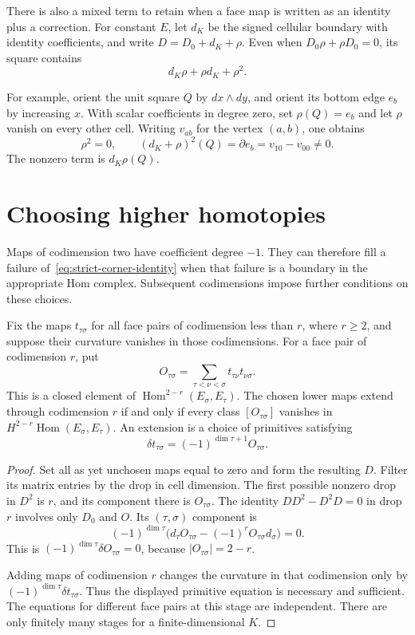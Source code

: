 There is also a mixed term to retain when a face map is written as
an identity plus a correction.
For constant $E$, let $d_K$ be the signed cellular boundary with identity
coefficients, and write $D=D_0+d_K+\rho$.
Even when $D_0\rho+\rho D_0=0$, its square contains
\[
 d_K\rho+\rho d_K+\rho^2.
\]

For example, orient the unit square $Q$ by $dx\wedge dy$,
and orient its bottom edge $e_b$ by increasing $x$.
With scalar coefficients in degree zero, set $\rho(Q)=e_b$
and let $\rho$ vanish on every other cell.
Writing $v_{ab}$ for the vertex $(a,b)$, one obtains
\[
 \rho^2=0,\qquad
 (d_K+\rho)^2(Q)=\partial e_b=v_{10}-v_{00}\ne0.
\]
The nonzero term is $d_K\rho(Q)$.

\section{Choosing higher homotopies}
Maps of codimension two have coefficient degree $-1$.
They can therefore fill a failure of~\eqref{eq:strict-corner-identity}
when that failure is a boundary in the appropriate Hom complex.
Subsequent codimensions impose further conditions on these choices.

\begin{proposition}\label{prop:cellular-obstruction}
Fix the maps $t_{\tau\sigma}$ for all face pairs of codimension less than
$r$, where $r\ge2$, and suppose their curvature vanishes in those
codimensions.
For a face pair of codimension $r$, put
\[
 O_{\tau\sigma}=
       \sum_{\tau<\nu<\sigma}t_{\tau\nu}t_{\nu\sigma}.
\]
This is a closed element of
$\operatorname{Hom}^{2-r}(E_\sigma,E_\tau)$.
The chosen lower maps extend through codimension $r$ if and only if
every class $[O_{\tau\sigma}]$ vanishes in
$H^{2-r}\operatorname{Hom}(E_\sigma,E_\tau)$.
An extension is a choice of primitives satisfying
\[
 \delta t_{\tau\sigma}
       =(-1)^{\dim\tau+1}O_{\tau\sigma}.
\]
\end{proposition}
\begin{proof}
Set all as yet unchosen maps equal to zero and form the resulting $D$.
Filter its matrix entries by the drop in cell dimension.
The first possible nonzero drop in $D^2$ is $r$, and its component there
is $O_{\tau\sigma}$.
The identity $DD^2-D^2D=0$ in drop $r$ involves only $D_0$ and $O$.
Its $(\tau,\sigma)$ component is
\[
 (-1)^{\dim\tau}
 \bigl(d_\tau O_{\tau\sigma}-(-1)^r
                     O_{\tau\sigma}d_\sigma\bigr)=0.
\]
This is $(-1)^{\dim\tau}\delta O_{\tau\sigma}=0$,
because $|O_{\tau\sigma}|=2-r$.

Adding maps of codimension $r$ changes the curvature in that codimension
only by $(-1)^{\dim\tau}\delta t_{\tau\sigma}$.
Thus the displayed primitive equation is necessary and sufficient.
The equations for different face pairs at this stage are independent.
There are only finitely many stages for a finite-dimensional $K$.
\end{proof}

